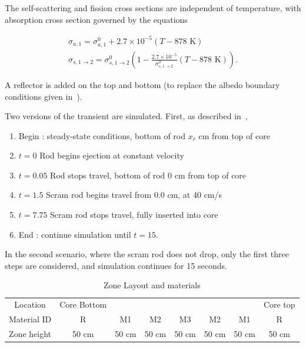 \documentclass{proposal}
\newcommand{\rarr}{\ensuremath{\rightarrow}}
\begin{document}
The self-scattering and fission cross sections are independent of temperature, with absorption cross section governed by the equations

\begin{gather}
    \sigma_{a, 1} = \sigma_{a, 1}^0 + 2.7\times 10^{-5}(T - 878\text{ K} )\\
    \sigma_{s, 1\rarr2} = \sigma_{s, 1\rarr2}^0\left(1 - \frac{2.7 \times 10^{-5}}{\sigma^0_{s, 1\rarr 2}}(T - 878\text{ K}) \right).
\end{gather}

A reflector is added on the top and bottom (to replace the albedo boundary conditions given in~\cite{larsen1981danish}).

Two versions of the transient are simulated. First, as described in~\cite{larsen1981danish}, 

\begin{enumerate}
    \item  Begin : steady-state conditions, bottom of rod $x_r$ cm from top of core
    \item $t=0$ Rod begins ejection at constant velocity
    \item $t=0.05$ Rod stops travel, bottom of rod 0 cm from top of core
    \item $t=1.5$ Scram rod begins travel from 0.0 cm, at 40 cm/s
    \item $t= 7.75$ Scram rod stops travel, fully inserted into core
    \item End : continue simulation until $t=15$.
\end{enumerate}

In the second scenario, where the scram rod does not drop, only the first three steps are considered, and simulation continues for 15 seconds.

\begin{table}
    \centering
    \caption{Zone Layout and materials}\label{tab:zones}
    \begin{tabular}{c|c|c|c|c|c|c|c}
        \hline
        Location &Core Bottom & && & & & Core top\\
        Material ID & R&M1 & M2 & M3 & M2 & M1 & R\\
        Zone height &50 cm&50 cm & 50 cm & 50 cm &  50 cm & 50 cm & 50 cm \\
        \hline
    \end{tabular}
\end{table}
\end{document}
